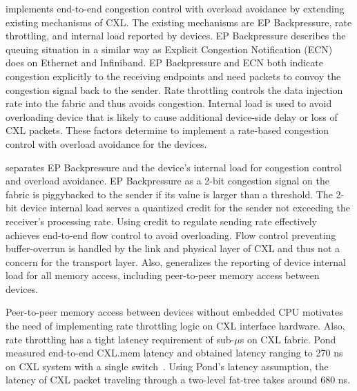 \aurelia implements end-to-end congestion control with overload avoidance by extending existing mechanisms of CXL. 
%
The existing mechanisms are EP Backpressure, rate throttling, and internal load reported by devices.
%
EP Backpressure describes the queuing situation in a similar way as Explicit Congestion Notification (ECN) does on Ethernet and Infiniband.
%
EP Backpressure and ECN both indicate congestion explicitly to the receiving endpoints and need packets to convoy the congestion signal back to the sender.
%
Rate throttling controls the data injection rate into the fabric and thus avoids congestion. 
%
%
Internal load is used to avoid overloading device that is likely to cause additional device-side delay or loss of CXL packets.
%
These factors determine \aurelia to implement a rate-based congestion control with overload avoidance for the devices. 


\aurelia separates EP Backpressure and the device's internal load for congestion control and overload avoidance.
%
EP Backpressure as a 2-bit congestion signal on the fabric is piggybacked to the sender if its value is larger than a threshold.
%
The 2-bit device internal load serves a quantized credit for the sender not exceeding the receiver's processing rate.
%
Using credit to regulate sending rate effectively achieves end-to-end flow control to avoid overloading. 
%
Flow control preventing buffer-overrun is handled by the link and physical layer of CXL and thus not a concern for the transport layer. 
%
Also, \aurelia generalizes the reporting of device internal load for all memory access, including peer-to-peer memory access between devices.

Peer-to-peer memory access between devices without embedded CPU motivates the need of implementing rate throttling logic on CXL interface hardware.   
%
Also, rate throttling has a tight latency requirement of sub-$\mu$s on CXL fabric.
%
Pond measured end-to-end CXL.mem latency and obtained latency ranging to 270 ns on CXL system with a single switch~\cite{cxl:hoti:2022, pond:asplos:2023}. Using Pond's latency assumption, the latency of CXL packet traveling through a two-level fat-tree takes around 680 ns.


